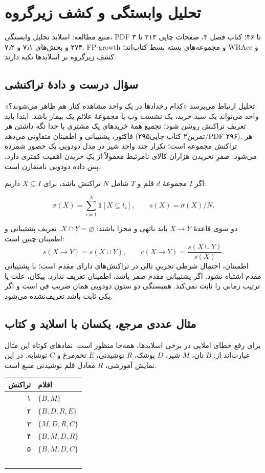 \documentclass[12pt,a4paper,oneside]{report}
\newcounter{ex}[chapter]
\newcommand{\source}[1]{\par{\small\color{muted} منبع مطالعه: #1}\par}
\begin{document}
\chapter{تحلیل وابستگی و کشف زیرگروه}
\source{اسلاید تحلیل وابستگی، PDF ۳ تا ۴۶؛ کتاب فصل ۴، صفحات چاپی ۲۱۳ تا ۲۷۴ و بخش‌های ۷٫۱ و ۷٫۲. FP-growth و مجموعه‌های بسته بسط کتاب‌اند؛ WRAcc و کشف زیرگروه بر اسلایدها تکیه دارند.}
\section{سؤال درست و دادهٔ تراکنشی}

تحلیل ارتباط می‌پرسد «کدام رخدادها در یک واحد مشاهده کنار هم ظاهر می‌شوند؟» واحد می‌تواند یک سبد خرید، یک نشست وب یا مجموعهٔ علائم یک بیمار باشد. ابتدا باید تعریف تراکنش روشن شود؛ تجمیع همهٔ خریدهای یک مشتری با جدا نگه داشتن هر فاکتور، پشتیبانی و اطمینان متفاوتی می‌دهد (تمرین۲ کتاب چاپی۲۹۵/PDF ۲۹۶). هر تراکنش مجموعه است؛ تکرار چند واحد شیر در مدل دودویی یک حضور شمرده می‌شود. صفرِ نخریدن هزاران کالای نامرتبط معمولاً از یکِ خریدن اهمیت کمتری دارد، پس داده دودویی نامتقارن است.

اگر $I$ مجموعهٔ $d$ قلم و $T$ شامل $N$ تراکنش باشد، برای $X\subseteq I$ داریم:

\[\sigma(X)=\sum_{i=1}^{N}\mathbf1[X\subseteq t_i],\qquad s(X)=\sigma(X)/N.\]

دو سوی قاعدهٔ $X\to Y$ باید ناتهی و مجزا باشند: $X\cap Y=\varnothing$. تعریف پشتیبانی و اطمینان چنین است:
\[s(X\to Y)=s(X\cup Y),\qquad c(X\to Y)=\frac{s(X\cup Y)}{s(X)}.\]
اطمینان، احتمال شرطی تجربیِ تالی در تراکنش‌های دارای مقدم است؛ با پشتیبانی مقدم اشتباه نشود. اگر پشتیبانی مقدم صفر باشد، اطمینان تعریف ندارد. پیکان، علت یا ترتیب زمانی را ثابت نمی‌کند. همبستگی دو ستون دودویی همان ضریب فی است و اگر یکی ثابت باشد تعریف‌نشده می‌شود.

\section{مثال عددی مرجع، یکسان با اسلاید و کتاب}

برای رفع خطای املایی  در برخی اسلایدها، همه‌جا  منظور است. نمادهای کوتاه این مثال عبارت‌اند از: $B$ نان، $M$ شیر، $D$ پوشک، $R$ نوشیدنی، $E$ تخم‌مرغ و $C$ نوشابه. در این نمایش آموزشی، $R$ معادل قلم نوشیدنی منبع است.

{\def\LTcaptype{table} %
\begin{longtable}[]{@{}rl@{}}
\toprule\noalign{}
تراکنش & اقلام \\
\midrule\noalign{}
\endhead
\bottomrule\noalign{}
\endlastfoot
۱ & $\{B,M\}$ \\\
۲ & $\{B,D,R,E\}$ \\\
۳ & $\{M,D,R,C\}$ \\\
۴ & $\{B,M,D,R\}$ \\\
۵ & $\{B,M,D,C\}$ \\\
\end{longtable}
}
\end{document}
